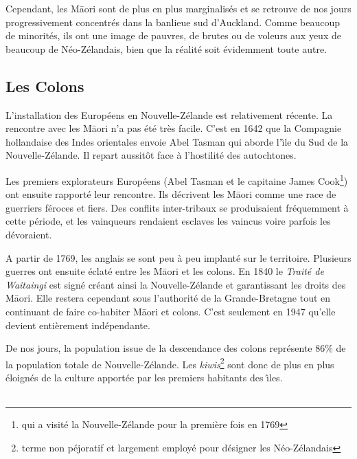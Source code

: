 \documentclass[11pt,journal]{RapportFR}
\newcommand{\Nz}{Nouvelle-Z\'elande\xspace}
\newcommand{\nzs}{n\'eo-z\'elandais\xspace}
\newcommand{\Nzs}{N\'eo-Z\'elandais\xspace}
\newcommand{\ids}{\^{\i}le du Sud\xspace}
\begin{document}
Cependant, les M\=aori sont de plus en plus marginalis\'es et se retrouve de nos jours progressivement concentr\'es dans la banlieue sud d'Auckland.
Comme beaucoup de minorit\'es, ils ont une image de pauvres, de brutes ou de voleurs aux yeux de beaucoup de \Nzs, bien que la r\'ealit\'e soit évidemment toute autre.

\subsection{Les Colons}
\label{sub:colons}

L’installation des Européens en \Nz est relativement récente. La rencontre avec les M\=aori n'a pas été très facile.
C'est en 1642 que la Compagnie hollandaise des Indes orientales envoie Abel Tasman qui aborde l'\ids de la \Nz.
Il repart aussitôt face à l'hostilité des autochtones.

Les premiers explorateurs Européens (Abel Tasman et le capitaine James Cook\footnote{qui a visité la \Nz pour la première fois en 1769}) ont ensuite rapporté leur rencontre. Ils décrivent les M\=aori comme une race de guerriers féroces et fiers. 
Des conflits inter-tribaux se produisaient fréquemment à cette période, et les vainqueurs rendaient esclaves les vaincus voire parfois les dévoraient.


A partir de 1769, les anglais se sont peu à peu implanté sur le territoire.
Plusieurs guerres ont ensuite éclaté entre les M\=aori et les colons.
En 1840 le \emph{Traité de Waitaingi} est signé créant ainsi la \Nz et garantissant les droits des M\=aori.
Elle restera cependant sous l'authorité de la Grande-Bretagne tout en continuant de faire co-habiter M\=aori et colons.
C'est seulement en 1947 qu'elle devient entièrement indépendante.

De nos jours, la population issue de la descendance des colons représente 86\% de la population totale de \Nz.
Les \emph{kiwis}\footnote{terme non péjoratif et largement employé pour désigner les \Nzs} sont donc de plus en plus éloignés de la culture apport\'ee par les premiers habitants des \^{\i}les.
\\
\\
\end{document}
